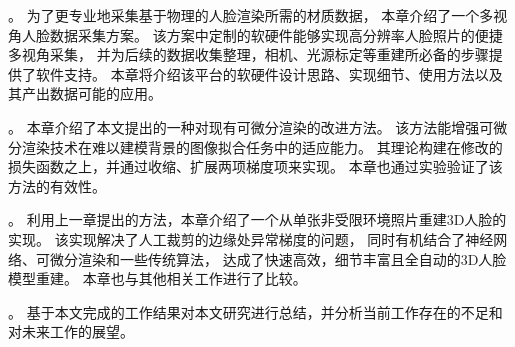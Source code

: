 。
为了更专业地采集基于物理的人脸渲染所需的材质数据，
本章介绍了一个多视角人脸数据采集方案。
该方案中定制的软硬件能够实现高分辨率人脸照片的便捷多视角采集，
并为后续的数据收集整理，相机、光源标定等重建所必备的步骤提供了软件支持。
本章将介绍该平台的软硬件设计思路、实现细节、使用方法以及其产出数据可能的应用。

。
本章介绍了本文提出的一种对现有可微分渲染的改进方法。
该方法能增强可微分渲染技术在难以建模背景的图像拟合任务中的适应能力。
其理论构建在修改的损失函数之上，并通过收缩、扩展两项梯度项来实现。
本章也通过实验验证了该方法的有效性。

。
利用上一章提出的方法，本章介绍了一个从单张非受限环境照片重建3D人脸的实现。
该实现解决了人工裁剪的边缘处异常梯度的问题，
同时有机结合了神经网络、可微分渲染和一些传统算法，
达成了快速高效，细节丰富且全自动的3D人脸模型重建。
本章也与其他相关工作进行了比较。

。
基于本文完成的工作结果对本文研究进行总结，并分析当前工作存在的不足和对未来工作的展望。
